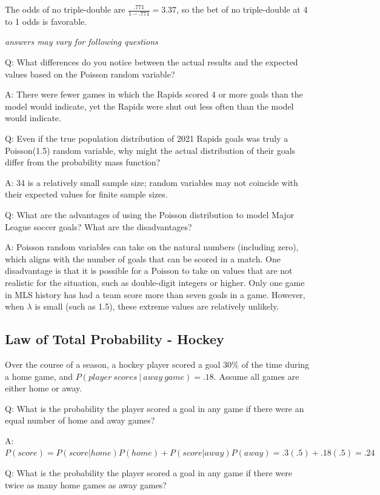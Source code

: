 \documentclass[
  11pt,
]{book}
\theoremstyle{definition}
\theoremstyle{definition}
\theoremstyle{definition}
\theoremstyle{definition}
\theoremstyle{remark}
\begin{document}
The odds of no triple-double are \(\frac{.771}{1-.771} = 3.37\), so the bet of no triple-double at 4 to 1 odds is favorable.

\emph{answers may vary for following questions}

Q: What differences do you notice between the actual results and the expected values based on the Poisson random variable?

A: There were fewer games in which the Rapids scored 4 or more goals than the model would indicate, yet the Rapids were shut out less often than the model would indicate.

Q: Even if the true population distribution of 2021 Rapids goals was truly a Poisson(1.5) random variable, why might the actual distribution of their goals differ from the probability mass function?

A: 34 is a relatively small sample size; random variables may not coincide with their expected values for finite sample sizes.

Q: What are the advantages of using the Poisson distribution to model Major League soccer goals? What are the disadvantages?

A: Poisson random variables can take on the natural numbers (including zero), which aligns with the number of goals that can be scored in a match. One disadvantage is that it is possible for a Poisson to take on values that are not realistic for the situation, such as double-digit integers or higher. Only one game in MLS history has had a team score more than seven goals in a game. However, when \(\lambda\) is small (such as 1.5), these extreme values are relatively unlikely.

\hypertarget{law-of-total-probability---hockey}{%
\subsection{Law of Total Probability - Hockey}\label{law-of-total-probability---hockey}}

Over the course of a season, a hockey player scored a goal 30\% of the time during a home game, and \(P(player\ scores\ |\ away\ game) = .18\). Assume all games are either home or away.

Q: What is the probability the player scored a goal in any game if there were an equal number of home and away games?

A: \(P(score) = P(score|home)P(home) + P(score|away)P(away) = .3(.5) + .18(.5) = .24\)

Q: What is the probability the player scored a goal in any game if there were twice as many home games as away games?
\end{document}

